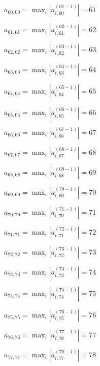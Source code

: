 \documentclass[a4paper,12pt]{article}
\begin{document}
$a _{ 60, 60 } =  \max _i |a _{ i, 60 } ^{ (61 - 1) } | = 61$

$a _{ 61, 61 } =  \max _i |a _{ i, 61 } ^{ (62 - 1) } | = 62$

$a _{ 62, 62 } =  \max _i |a _{ i, 62 } ^{ (63 - 1) } | = 63$

$a _{ 63, 63 } =  \max _i |a _{ i, 63 } ^{ (64 - 1) } | = 64$

$a _{ 64, 64 } =  \max _i |a _{ i, 64 } ^{ (65 - 1) } | = 65$

$a _{ 65, 65 } =  \max _i |a _{ i, 65 } ^{ (66 - 1) } | = 66$

$a _{ 66, 66 } =  \max _i |a _{ i, 66 } ^{ (67 - 1) } | = 67$

$a _{ 67, 67 } =  \max _i |a _{ i, 67 } ^{ (68 - 1) } | = 68$

$a _{ 68, 68 } =  \max _i |a _{ i, 68 } ^{ (69 - 1) } | = 69$

$a _{ 69, 69 } =  \max _i |a _{ i, 69 } ^{ (70 - 1) } | = 70$

$a _{ 70, 70 } =  \max _i |a _{ i, 70 } ^{ (71 - 1) } | = 71$

$a _{ 71, 71 } =  \max _i |a _{ i, 71 } ^{ (72 - 1) } | = 72$

$a _{ 72, 72 } =  \max _i |a _{ i, 72 } ^{ (73 - 1) } | = 73$

$a _{ 73, 73 } =  \max _i |a _{ i, 73 } ^{ (74 - 1) } | = 74$

$a _{ 74, 74 } =  \max _i |a _{ i, 74 } ^{ (75 - 1) } | = 75$

$a _{ 75, 75 } =  \max _i |a _{ i, 75 } ^{ (76 - 1) } | = 76$

$a _{ 76, 76 } =  \max _i |a _{ i, 76 } ^{ (77 - 1) } | = 77$

$a _{ 77, 77 } =  \max _i |a _{ i, 77 } ^{ (78 - 1) } | = 78$
\end{document}
